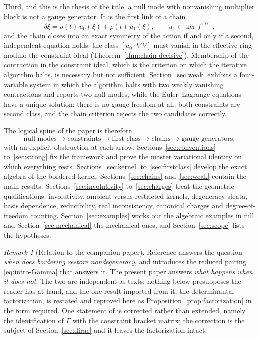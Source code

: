 \documentclass[12pt]{article}
\theoremstyle{plain}
\theoremstyle{definition}
\theoremstyle{remark}
\newtheorem{remark}[theorem]{Remark}
\begin{document}
	Third, and this is the thesis of the title, a null mode with nonvanishing
	multiplier block is not a gauge generator. It is the first link of a chain
	\begin{equation}
		\delta\xi=\rho(t)\,u_{0}(\xi)+\dot\rho(t)\,u_{1}(\xi),
		\qquad u_{1}\in\ker f^{(0)},
		\label{eq:intro-chain}
	\end{equation}
	and the chain closes into an exact symmetry of the action if and only if a
	second, independent equation holds: the class $[u_{0}\cdot\nabla V]$ must vanish
	in the effective ring modulo the constraint ideal
	(Theorem~\ref{thm:chain-decisive}). Membership of the contraction in the
	constraint ideal, which is the criterion on which the iterative algorithm halts,
	is necessary but not sufficient. Section~\ref{sec:weak} exhibits a four-variable
	system in which the algorithm halts with two weakly vanishing contractions and
	reports two null modes, while the Euler--Lagrange equations have a unique
	solution: there is no gauge freedom at all, both constraints are second class,
	and the chain criterion rejects the two candidates correctly.
	
	The logical spine of the paper is therefore
	\[
	\text{null modes}\longrightarrow\text{constraints}
	\longrightarrow\text{first class}\longrightarrow\text{chains}
	\longrightarrow\text{gauge generators},
	\]
	with an explicit obstruction at each arrow. Sections~\ref{sec:conventions}
	to~\ref{sec:strong} fix the framework and prove the master variational identity
	on which everything rests. Sections~\ref{sec:kernel} to~\ref{sec:firstclass}
	develop the exact algebra of the bordered kernel. Sections~\ref{sec:chains}
	and~\ref{sec:weak} contain the main results. Sections~\ref{sec:involutivity}
	to~\ref{sec:charges} treat the geometric qualifications: involutivity, ambient
	versus restricted kernels, degeneracy strata, basis dependence, reducibility,
	real inconsistency, canonical charges and degree-of-freedom counting.
	Section~\ref{sec:examples} works out the algebraic examples in full and
	Section~\ref{sec:mechanical} the mechanical ones, and Section~\ref{sec:scope}
	lists the hypotheses.
	
	\begin{remark}[Relation to the companion paper]
		\label{rem:companion}
		Reference \cite{CLMCP2026} answers the question \emph{when does bordering
			restore nondegeneracy}, and introduces the reduced pairing
		\eqref{eq:intro-Gamma} that answers it. The present paper answers \emph{what
			happens when it does not}. The two are independent as texts: nothing below
		presupposes the reader has \cite{CLMCP2026} at hand, and the one result imported
		from it, the determinantal factorization, is restated and reproved here as
		Proposition~\ref{prop:factorization} in the form required. One statement of
		\cite{CLMCP2026} is corrected rather than extended, namely the identification of
		$\Gamma$ with the constraint bracket matrix; the correction is the subject of
		Section~\ref{sec:dirac} and it leaves the factorization intact.
	\end{remark}
	
\end{document}
